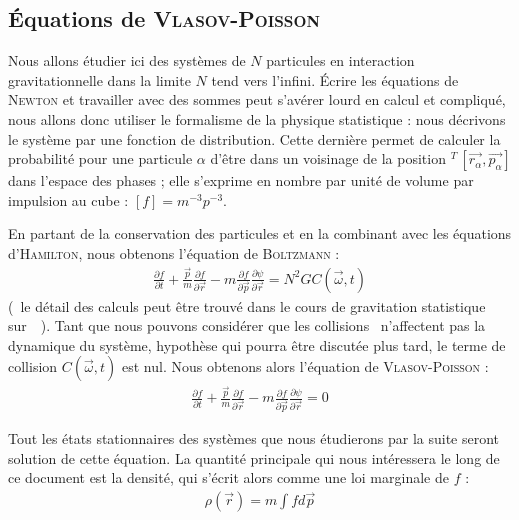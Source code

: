 \subsection{Équations de \textsc{Vlasov}-\textsc{Poisson}}
	Nous allons étudier ici des systèmes de $N$ particules en interaction gravitationnelle dans la limite $N$ tend vers l'infini.
	Écrire les équations de \textsc{Newton} et travailler avec des sommes peut
	s'avérer lourd en calcul et compliqué, nous allons donc utiliser le formalisme
	de la physique statistique : nous décrivons le système par une fonction de distribution.
	Cette dernière permet de calculer la probabilité pour une particule $\alpha$ d'être dans un voisinage de la
	position ${}^T\,\left[\vec{r_\alpha},\vec{p_\alpha}\right]$ dans l'espace des phases ; elle
	s'exprime en nombre par unité de volume par impulsion au cube : $\left[ f\right] = m^{-3}p^{-3}$.

	En partant de la conservation des particules et en la combinant avec les équations d'\textsc{Hamilton},
	nous obtenons l'équation de \textsc{Boltzmann} :
	\begin{align}
		\frac{\partial f}{\partial t} +\frac{\vec{p}}{m}\frac{\partial f}{\partial \vec{r}} - m\frac{\partial f}{\partial \vec{p}} \frac{\partial \psi}{\partial \vec{r}} = N^2 G C(\vec{\omega}, t)
		\label{Fok-Plan}
	\end{align}
	(~le détail des calculs peut être trouvé dans le cours de gravitation statistique sur~\cite{CoursJP}~).
	Tant que nous pouvons considérer que les \og collisions \fg~n'affectent pas la dynamique du système, hypothèse qui pourra être discutée plus tard, le
	terme de collision $ C(\vec{\omega}, t) $ est nul. Nous obtenons alors l'équation de
	\textsc{Vlasov-Poisson} :
	\begin{align}
		\frac{\partial f}{\partial t} +\frac{\vec{p}}{m}\frac{\partial f}{\partial \vec{r}} - m\frac{\partial f}{\partial \vec{p}} \frac{\partial \psi}{\partial \vec{r}} = 0
		\label{Vla-Pois}
	\end{align}

	Tout les états stationnaires des systèmes que nous étudierons par la suite seront solution de cette équation.
	La quantité principale qui nous intéressera le long de ce document est la densité, qui s'écrit alors comme une loi marginale de $f$ :
	\begin{align}
		\rho(\vec{r}) = m\int f d\vec{p}
	\end{align}


